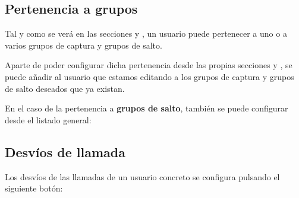 \documentclass[letterpaper,10pt,spanish]{sphinxmanual}
\begin{document}
\subsection{Pertenencia a grupos}
\label{pbx_features/users:group-configuration}
\noindent{}

Tal y como se verá en las secciones {\hyperref[pbx_features/huntgroups:huntgroups]{}} y {\hyperref[pbx_features/call_captures:capture\string-groups]{}}, un usuario puede pertenecer a uno o a varios grupos de captura y grupos de salto.

Aparte de poder configurar dicha pertenencia desde las propias secciones {\hyperref[pbx_features/huntgroups:huntgroups]{}} y {\hyperref[pbx_features/call_captures:capture\string-groups]{}}, se puede añadir al usuario que estamos editando a los grupos de captura y grupos de salto deseados que ya existan.

En el caso de la pertenencia a \textbf{grupos de salto}, también se puede configurar desde el listado general:



\subsection{Desvíos de llamada}
\label{pbx_features/users:user-call-forward}
Los desvíos de las llamadas de un usuario concreto se configura pulsando el siguiente botón:
\end{document}
